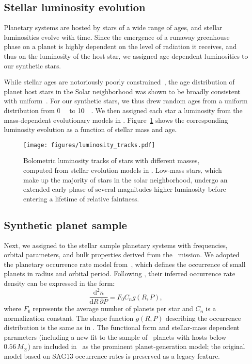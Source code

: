 \documentclass[twocolumn,twocolappendix]{aastex631}
\begin{document}
\subsection{Stellar luminosity evolution}
Planetary systems are hosted by stars of a wide range of ages, and stellar luminosities evolve with time.
Since the emergence of a runaway greenhouse phase on a planet is highly dependent on the level of radiation it receives, and thus on the luminosity of the host star, we assigned age-dependent luminosities to our synthetic stars.

While stellar ages are notoriously poorly constrained~\cite[e.g.,][]{Adams2005}, the age distribution of planet host stars in the Solar neighborhood was shown to be broadly consistent with uniform~\citep{Reid2007,Gaidos2023}.
For our synthetic stars, we thus drew random ages from a uniform distribution from \SI{0}{\giga\year} to \SI{10}{\giga\year}.
We then assigned each star a luminosity from the mass-dependent evolutionary models in \citet{Baraffe1998}.
Figure~\ref{fig:luminosity_tracks} shows the corresponding luminosity evolution as a function of stellar mass and age.
\begin{figure}[ht!]
    \begin{centering}
        \texttt{[image: figures/luminosity\_tracks.pdf]}
        \caption{
            Bolometric luminosity tracks of stars with different masses, computed from stellar evolution models in \citet{Baraffe1998}.
            Low-mass stars, which make up the majority of stars in the solar neighborhood, undergo an extended early phase of several magnitudes higher luminosity before entering a lifetime of relative faintness.
        }
        \label{fig:luminosity_tracks}
    \end{centering}
\end{figure}


\subsection{Synthetic planet sample}\label{sec:syn_planets}
Next, we assigned to the stellar sample planetary systems with frequencies, orbital parameters, and bulk properties derived from the \kepler\ mission.
We adopted the planetary occurrence rate model from~\citet{Bergsten2022}, which defines the occurrence of small planets in radius and orbital period. Following \citet{Youdin2011a}, their inferred occurrence rate density can be expressed in the form:
\begin{equation}
    \frac{\mathrm{d}^2n}{\mathrm{d}R \, \partial P} = F_0 C_n g(R, P),
\end{equation}
where $F_0$ represents the average number of planets per star and $C_n$ is a normalization constant. The shape function $g(R,P)$ describing the occurrence distribution is the same as in \citet{Bergsten2022}. The functional form and stellar-mass dependent parameters (including a new fit to the sample of \kepler\ planets with hosts below $0.56\,M_{\odot}$) are included in \bioverse\ as the prominent planet-generation model; the original model based on SAG13 occurrence rates is preserved as a legacy feature.
\end{document}

